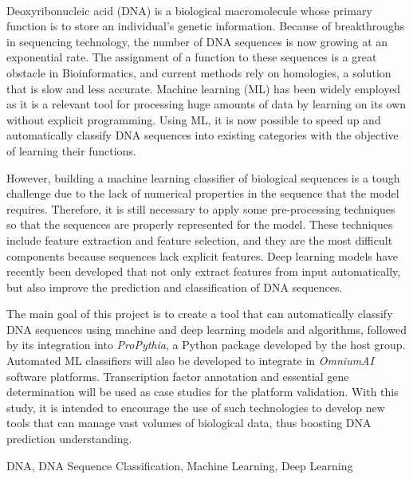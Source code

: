 {\large \textbf{\thetitle}}\\[1ex]
\noindent Deoxyribonucleic acid (DNA) is a biological macromolecule whose primary function is to store an individual's genetic information. Because of breakthroughs in sequencing technology, the number of DNA sequences is now growing at an exponential rate. The assignment of a function to these sequences is a great obstacle in Bioinformatics, and current methods rely on homologies, a solution that is slow and less accurate. Machine learning (ML) has been widely employed as it is a relevant tool for processing huge amounts of data by learning on its own without explicit programming. Using ML, it is now possible to speed up and automatically classify DNA sequences into existing categories with the objective of learning their functions. 

However, building a machine learning classifier of biological sequences is a tough challenge due to the lack of numerical properties in the sequence that the model requires. Therefore, it is still necessary to apply some pre-processing techniques so that the sequences are properly represented for the model. These techniques include feature extraction and feature selection, and they are the most difficult components because sequences lack explicit features. Deep learning models have recently been developed that not only extract features from input automatically, but also improve the prediction and classification of DNA sequences.

The main goal of this project is to create a tool that can automatically classify DNA sequences using machine and deep learning models and algorithms, followed by its integration into \textit{ProPythia}, a Python package developed by the host group. Automated ML classifiers will also be developed to integrate in \textit{OmniumAI} software platforms. Transcription factor annotation and essential gene determination will be used as case studies for the platform validation. With this study, it is intended to encourage the use of such technologies to develop new tools that can manage vast volumes of biological data, thus boosting DNA prediction understanding.

\begin{keywords}
DNA, DNA Sequence Classification, Machine Learning, Deep Learning
\end{keywords} 
